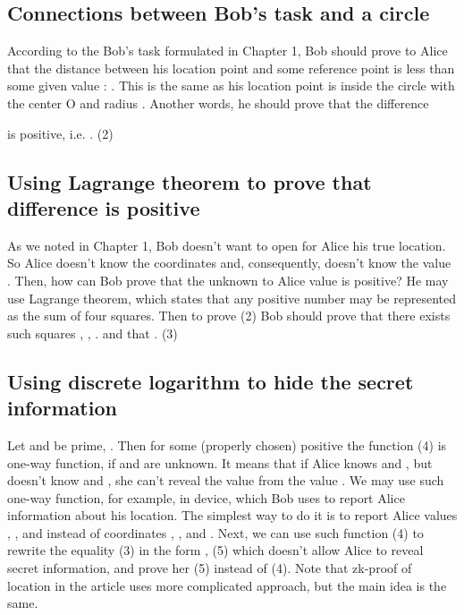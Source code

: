 \documentclass{article}
\begin{document}
\subsection{Connections between Bob’s task and a circle}  %
According to the Bob’s task formulated in Chapter 1,
Bob should prove to Alice that the distance between his location point   
and some reference point      is less than some given value     :
    .
This is the same as his location point      is inside the circle with the center O and radius     .
Another words, he should prove that the difference
    
is positive, i.e.
    .                                    (2)

\subsection{Using Lagrange theorem to prove that difference is positive}  %
As we noted in Chapter 1, Bob doesn’t want to open for Alice his true location.
So Alice doesn’t know the coordinates      and, consequently, doesn’t know the value
    .
Then, how can Bob prove that the unknown to Alice value is positive?
He may use Lagrange theorem, which states that any positive number may be represented as the sum of four squares.
Then to prove (2) Bob should prove that there exists such squares     ,     ,     . and      that
    .                     (3)

\subsection{Using discrete logarithm to hide the secret information}  %
Let      and      be prime,     . Then for some (properly chosen) positive      the function
                                                            (4)
is one-way function, if      and      are unknown.
It means that if Alice knows      and     , but doesn’t know      and     ,
she can’t reveal the value      from the value     .
We may use such one-way function, for example, in device, which Bob uses to report Alice information about his location.
The simplest way to do it is to report Alice values     ,     , and      instead of coordinates     ,
   , and     .
Next, we can use such function (4) to rewrite the equality (3) in the form
    ,                                    (5)
which doesn’t allow Alice to reveal secret information, and prove her (5) instead of (4).
Note that zk-proof of location in the article uses more complicated approach, but the main idea is the same.
\end{document}
